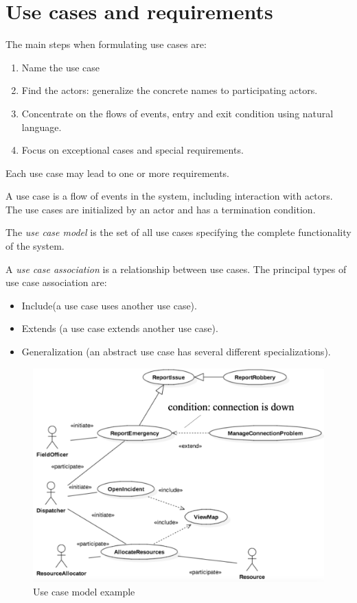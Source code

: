 \documentclass[12pt, a4paper]{report}
\newtheorem[style=M,bodystyle=\normalfont]{theorem}{Theorem}
\newtheorem[style=M,bodystyle=\normalfont]{corollary}{Corollary}
\newtheorem[style=M,bodystyle=\normalfont]{lemma}{Lemma}
\newtheorem[style=M,bodystyle=\normalfont]{definition}{Definition}
\begin{document}
\section{Use cases and requirements}
    The main steps when formulating use cases are: 
    \begin{enumerate}
        \item Name the use case
        \item Find the actors: generalize the concrete names to participating actors.
        \item Concentrate on the flows of events, entry and exit condition using natural language.
        \item Focus on exceptional cases and special requirements.
    \end{enumerate}
    Each use case may lead to one or more requirements.
    \par
    A use case is a flow of events in the system, including interaction with actors. The use cases are initialized by an actor and has a termination condition. 
    \begin{definition}
        The \emph{use case model} is the set of all use cases specifying the complete functionality of the system. 
    \end{definition}
    \begin{definition}
        A \emph{use case association} is a relationship between use cases. The principal types of use case association are: 
        \begin{itemize}
            \item Include(a use case uses another use case).
            \item Extends (a use case extends another use case).
            \item Generalization (an abstract use case has several different specializations).
        \end{itemize}
    \end{definition}
    \begin{figure}
        \centering
        \includegraphics[width=0.5\linewidth]{images/usecase.png}
        \caption{Use case model example}
    \end{figure}
\end{document}

